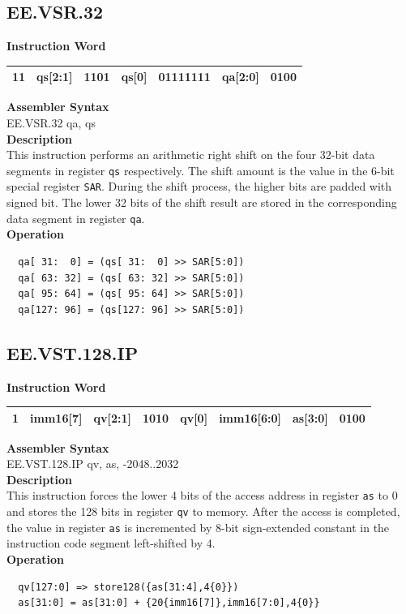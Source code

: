 \clearpage
\subsection{EE.VSR.32}\label{instruction:EEVSR32}
\setlength\tabcolsep{6pt}
\textbf{Instruction Word} \\
\begin{tabular}{|c|c|c|c|c|c|c|}
	\hline
	11 & qs[2:1] & 1101 & qs[0] & 01111111 & qa[2:0] & 0100 \\
	\hline
\end{tabular}

\textbf{Assembler Syntax} \\
EE.VSR.32 qa, qs \\
\textbf{Description} \\
This instruction performs an arithmetic right shift on the four 32-bit data segments in register \lstinline{qs} respectively. The shift amount is the value in the 6-bit special register \lstinline{SAR}. During the shift process, the higher bits are padded with signed bit. The lower 32 bits of the shift result are stored in the corresponding data segment in register \lstinline{qa}.\\
\textbf{Operation}
\begin{lstlisting}
  qa[ 31:  0] = (qs[ 31:  0] >> SAR[5:0])
  qa[ 63: 32] = (qs[ 63: 32] >> SAR[5:0])
  qa[ 95: 64] = (qs[ 95: 64] >> SAR[5:0])
  qa[127: 96] = (qs[127: 96] >> SAR[5:0])
\end{lstlisting}

\clearpage
\subsection{EE.VST.128.IP}\label{instruction:EEVST128IP}
\setlength\tabcolsep{6pt}
\textbf{Instruction Word} \\
\begin{tabular}{|c|c|c|c|c|c|c|c|}
	\hline
	1 & imm16[7] & qv[2:1] & 1010 & qv[0] & imm16[6:0] & as[3:0] & 0100 \\
	\hline
\end{tabular}

\textbf{Assembler Syntax} \\
EE.VST.128.IP qv, as, -2048..2032 \\
\textbf{Description} \\
This instruction forces the lower 4 bits of the access address in register \lstinline{as} to 0 and stores the 128 bits in register \lstinline{qv} to memory. After the access is completed, the value in register \lstinline{as} is incremented by 8-bit sign-extended constant in the instruction code segment left-shifted by 4.\\
\textbf{Operation}
\begin{lstlisting}
  qv[127:0] => store128({as[31:4],4{0}})
  as[31:0] = as[31:0] + {20{imm16[7]},imm16[7:0],4{0}}
\end{lstlisting}

